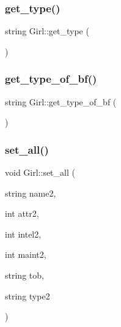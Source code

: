 \mbox{\label{classGirl_a63e4086c7849a10410af9031aabf4eae}} 
\subsubsection{\texorpdfstring{get\+\_\+type()}{get\_type()}}
{\footnotesize\ttfamily string Girl\+::get\+\_\+type (\begin{DoxyParamCaption}{ }\end{DoxyParamCaption})}

\mbox{\label{classGirl_a1e1ffa542b554118319d2ced3867ed95}} 
\subsubsection{\texorpdfstring{get\+\_\+type\+\_\+of\+\_\+bf()}{get\_type\_of\_bf()}}
{\footnotesize\ttfamily string Girl\+::get\+\_\+type\+\_\+of\+\_\+bf (\begin{DoxyParamCaption}{ }\end{DoxyParamCaption})}

\mbox{\label{classGirl_aa63d062fe13de87cccda70537d7eb91c}} 
\subsubsection{\texorpdfstring{set\+\_\+all()}{set\_all()}}
{\footnotesize\ttfamily void Girl\+::set\+\_\+all (\begin{DoxyParamCaption}\item[{string}]{name2,  }\item[{int}]{attr2,  }\item[{int}]{intel2,  }\item[{int}]{maint2,  }\item[{string}]{tob,  }\item[{string}]{type2 }\end{DoxyParamCaption})}

\mbox{\label{classGirl_aec996595d3c0a9846565f334e968fd76}} 
